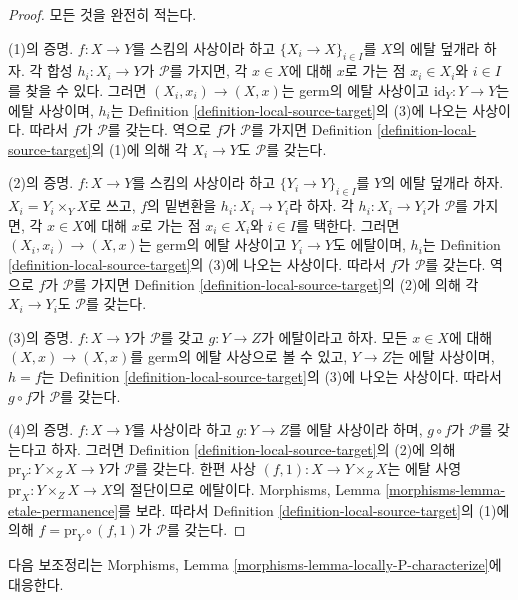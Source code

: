 \begin{proof}
모든 것을 완전히 적는다.

\medskip\noindent
(1)의 증명. $f : X \to Y$를 스킴의 사상이라 하고
$\{X_i \to X\}_{i \in I}$를 $X$의 에탈 덮개라 하자. 각 합성
$h_i : X_i \to Y$가 $\mathcal{P}$를 가지면, 각 $x \in X$에 대해
$x$로 가는 점 $x_i \in X_i$와 $i \in I$를 찾을 수 있다. 그러면
$(X_i, x_i) \to (X, x)$는 germ의 에탈 사상이고
$\text{id}_Y : Y \to Y$는 에탈 사상이며, $h_i$는 Definition
\ref{definition-local-source-target}의 (3)에 나오는 사상이다.
따라서 $f$가 $\mathcal{P}$를 갖는다. 역으로 $f$가 $\mathcal{P}$를
가지면 Definition \ref{definition-local-source-target}의 (1)에 의해
각 $X_i \to Y$도 $\mathcal{P}$를 갖는다.

\medskip\noindent
(2)의 증명. $f : X \to Y$를 스킴의 사상이라 하고
$\{Y_i \to Y\}_{i \in I}$를 $Y$의 에탈 덮개라 하자.
$X_i = Y_i \times_Y X$로 쓰고, $f$의 밑변환을
$h_i : X_i \to Y_i$라 하자. 각 $h_i : X_i \to Y_i$가
$\mathcal{P}$를 가지면, 각 $x \in X$에 대해 $x$로 가는 점
$x_i \in X_i$와 $i \in I$를 택한다. 그러면
$(X_i, x_i) \to (X, x)$는 germ의 에탈 사상이고 $Y_i \to Y$도
에탈이며, $h_i$는 Definition \ref{definition-local-source-target}의
(3)에 나오는 사상이다. 따라서 $f$가 $\mathcal{P}$를 갖는다.
역으로 $f$가 $\mathcal{P}$를 가지면 Definition
\ref{definition-local-source-target}의 (2)에 의해 각
$X_i \to Y_i$도 $\mathcal{P}$를 갖는다.

\medskip\noindent
(3)의 증명. $f : X \to Y$가 $\mathcal{P}$를 갖고
$g : Y \to Z$가 에탈이라고 하자. 모든 $x \in X$에 대해
$(X, x) \to (X, x)$를 germ의 에탈 사상으로 볼 수 있고,
$Y \to Z$는 에탈 사상이며, $h = f$는 Definition
\ref{definition-local-source-target}의 (3)에 나오는 사상이다.
따라서 $g \circ f$가 $\mathcal{P}$를 갖는다.

\medskip\noindent
(4)의 증명. $f : X \to Y$를 사상이라 하고 $g : Y \to Z$를
에탈 사상이라 하며, $g \circ f$가 $\mathcal{P}$를 갖는다고 하자.
그러면 Definition \ref{definition-local-source-target}의 (2)에 의해
$\text{pr}_Y : Y \times_Z X \to Y$가 $\mathcal{P}$를 갖는다.
한편 사상 $(f, 1) : X \to Y \times_Z X$는 에탈 사영
$\text{pr}_X : Y \times_Z X \to X$의 절단이므로 에탈이다. Morphisms,
Lemma \ref{morphisms-lemma-etale-permanence}를 보라. 따라서 Definition
\ref{definition-local-source-target}의 (1)에 의해
$f = \text{pr}_Y \circ (f, 1)$가 $\mathcal{P}$를 갖는다.
\end{proof}

\noindent
다음 보조정리는 Morphisms, Lemma
\ref{morphisms-lemma-locally-P-characterize}에 대응한다.

